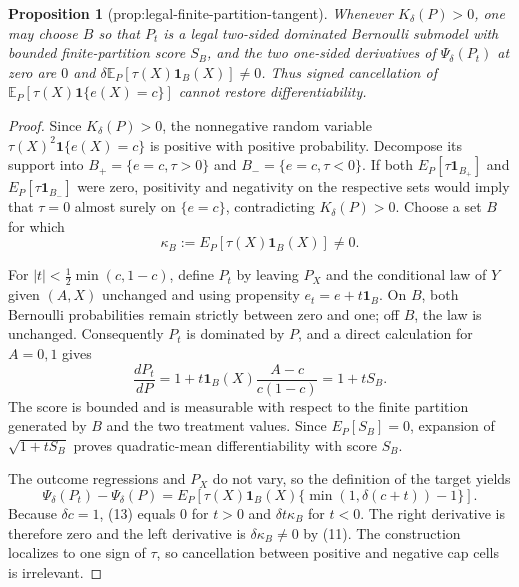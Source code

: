 \documentclass{article}
\newtheorem{proposition}{Proposition}
\begin{document}
\begin{proposition}[prop:legal-finite-partition-tangent]\label{prop:legal-finite-partition-tangent}
Whenever \(K_\delta(P)>0\), one may choose \(B\) so that \(P_t\) is a legal two-sided dominated Bernoulli submodel with bounded finite-partition score \(S_B\), and the two one-sided derivatives of \(\Psi_\delta(P_t)\) at zero are \(0\) and \(\delta\mathbb E_P[\tau(X)\mathbf 1_B(X)]\ne0\). Thus signed cancellation of \(\mathbb E_P[\tau(X)\mathbf 1\{e(X)=c\}]\) cannot restore differentiability.
\end{proposition}
\begin{proof}
Since \(K_\delta(P)>0\), the nonnegative random variable
\(\tau(X)^2\mathbf1\{e(X)=c\}\) is positive with positive probability.  Decompose its support into
\(B_+=\{e=c,\tau>0\}\) and \(B_-=\{e=c,\tau<0\}\).  If both
\(E_P[\tau\mathbf1_{B_+}]\) and \(E_P[\tau\mathbf1_{B_-}]\) were zero, positivity and negativity on the respective sets would imply that \(\tau=0\) almost surely on \(\{e=c\}\), contradicting \(K_\delta(P)>0\).  Choose a set \(B\) for which
\begin{equation}
 \kappa_B:=E_P[\tau(X)\mathbf1_B(X)]\ne0.                                                 \tag{11}
\end{equation}

For \(|t|<\frac12\min(c,1-c)\), define \(P_t\) by leaving \(P_X\) and the conditional law of \(Y\) given \((A,X)\) unchanged and using propensity
\(e_t=e+t\mathbf1_B\).  On \(B\), both Bernoulli probabilities remain strictly between zero and one; off \(B\), the law is unchanged.  Consequently \(P_t\) is dominated by \(P\), and a direct calculation for \(A=0,1\) gives
\begin{equation}
 \frac{dP_t}{dP}=1+t\mathbf1_B(X)\frac{A-c}{c(1-c)}=1+tS_B.                              \tag{12}
\end{equation}
The score is bounded and is measurable with respect to the finite partition generated by \(B\) and the two treatment values.  Since
\(E_P[S_B]=0\), expansion of \(\sqrt{1+tS_B}\) proves quadratic-mean differentiability with score \(S_B\).

The outcome regressions and \(P_X\) do not vary, so the definition of the target yields
\begin{equation}
 \Psi_\delta(P_t)-\Psi_\delta(P)
 =E_P\!\left[\tau(X)\mathbf1_B(X)
 \{\min(1,\delta(c+t))-1\}\right].                                                       \tag{13}
\end{equation}
Because \(\delta c=1\), (13) equals \(0\) for \(t>0\) and
\(\delta t\kappa_B\) for \(t<0\).  The right derivative is therefore zero and the left derivative is \(\delta\kappa_B\ne0\) by (11).  The construction localizes to one sign of \(\tau\), so cancellation between positive and negative cap cells is irrelevant.
\end{proof}
\end{document}

